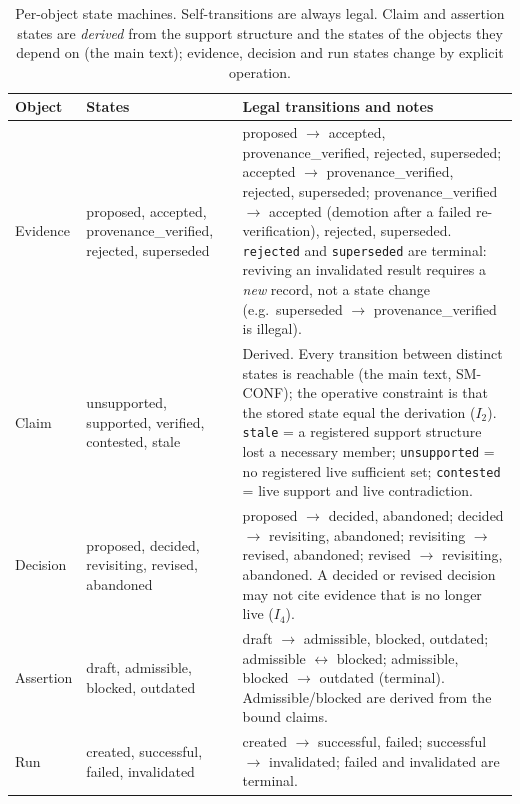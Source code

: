\documentclass[journal]{IEEEtran}
\begin{document}
\begin{table}[!t]
\centering
\caption{Per-object state machines. Self-transitions are always legal. Claim and assertion states are \emph{derived} from the support structure and the states of the objects they depend on (the main text); evidence, decision and run states change by explicit operation.}
\label{tab:state_machines}
\scriptsize
\begin{tabularx}{\textwidth}{l>{\raggedright\arraybackslash}p{}>{\raggedright\arraybackslash}X}
\toprule
Object & States & Legal transitions and notes \\
\midrule
Evidence & proposed, accepted, provenance\_verified, rejected, superseded &
proposed $\to$ accepted, provenance\_verified, rejected, superseded; accepted $\to$ provenance\_verified, rejected, superseded; provenance\_verified $\to$ accepted (demotion after a failed re-verification), rejected, superseded. \texttt{rejected} and \texttt{superseded} are terminal: reviving an invalidated result requires a \emph{new} record, not a state change (e.g.\ superseded $\to$ provenance\_verified is illegal). \\
Claim & unsupported, supported, verified, contested, stale &
Derived. Every transition between distinct states is reachable (the main text, SM-CONF); the operative constraint is that the stored state equal the derivation ($I_2$). \texttt{stale} = a registered support structure lost a necessary member; \texttt{unsupported} = no registered live sufficient set; \texttt{contested} = live support and live contradiction. \\
Decision & proposed, decided, revisiting, revised, abandoned &
proposed $\to$ decided, abandoned; decided $\to$ revisiting, abandoned; revisiting $\to$ revised, abandoned; revised $\to$ revisiting, abandoned. A decided or revised decision may not cite evidence that is no longer live ($I_4$). \\
Assertion & draft, admissible, blocked, outdated &
draft $\to$ admissible, blocked, outdated; admissible $\leftrightarrow$ blocked; admissible, blocked $\to$ outdated (terminal). Admissible/blocked are derived from the bound claims. \\
Run & created, successful, failed, invalidated &
created $\to$ successful, failed; successful $\to$ invalidated; failed and invalidated are terminal. \\
\bottomrule
\end{tabularx}
\end{table}
\end{document}
